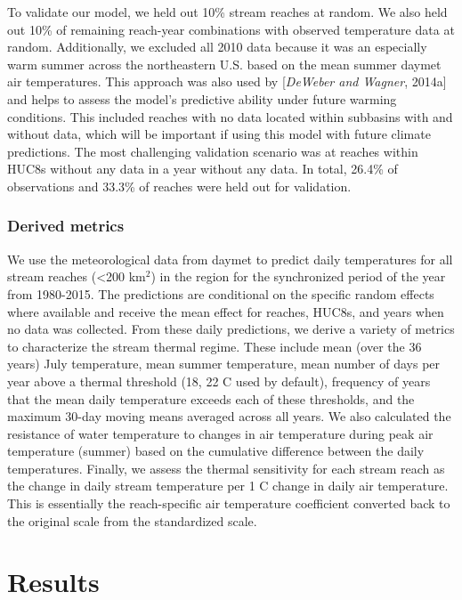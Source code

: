 To validate our model, we held out 10\% stream reaches at random. We
also held out 10\% of remaining reach-year combinations with observed
temperature data at random. Additionally, we excluded all 2010 data
because it was an especially warm summer across the northeastern U.S.
based on the mean summer daymet air temperatures. This approach was also
used by {[}\emph{DeWeber and Wagner}, 2014a{]} and helps to assess the
model's predictive ability under future warming conditions. This
included reaches with no data located within subbasins with and without
data, which will be important if using this model with future climate
predictions. The most challenging validation scenario was at reaches
within HUC8s without any data in a year without any data. In total,
26.4\% of observations and 33.3\% of reaches were held out for
validation.

\subsubsection{Derived metrics}\label{derived-metrics}

We use the meteorological data from daymet to predict daily temperatures
for all stream reaches (\textless{}200 km\(^2\)) in the region for the
synchronized period of the year from 1980-2015. The predictions are
conditional on the specific random effects where available and receive
the mean effect for reaches, HUC8s, and years when no data was
collected. From these daily predictions, we derive a variety of metrics
to characterize the stream thermal regime. These include mean (over the
36 years) July temperature, mean summer temperature, mean number of days
per year above a thermal threshold (18, 22 C used by default), frequency
of years that the mean daily temperature exceeds each of these
thresholds, and the maximum 30-day moving means averaged across all
years. We also calculated the resistance of water temperature to changes
in air temperature during peak air temperature (summer) based on the
cumulative difference between the daily temperatures. Finally, we assess
the thermal sensitivity for each stream reach as the change in daily
stream temperature per 1 C change in daily air temperature. This is
essentially the reach-specific air temperature coefficient converted
back to the original scale from the standardized scale.

\section{Results}\label{results}

